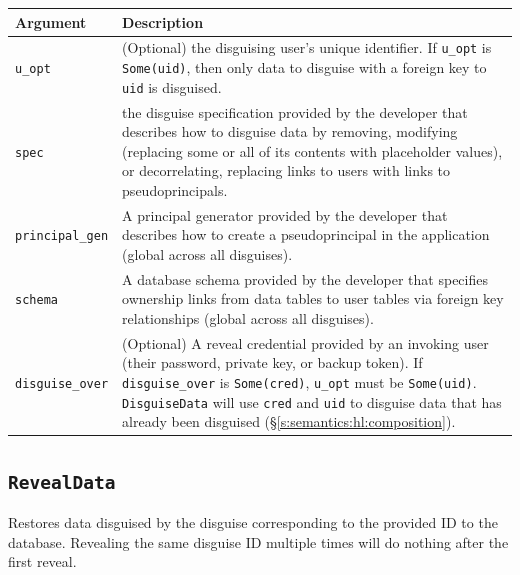     \begin{center}
    \begin{longtable}{|m{}|m{}|}
        \hline
        \textbf{Argument} & \textbf{Description} \\
        \hline
        \texttt{u\_opt}& (Optional) the disguising user's unique identifier. If
            \texttt{u\_opt} is \texttt{Some(uid)}, then only data to disguise with
            a foreign key to \texttt{uid} is disguised.\\

        \hline
        \texttt{spec}& the disguise specification provided by the
            developer that describes how to disguise data by
    removing, modifying (replacing some or all of its contents with placeholder
    values), or decorrelating, replacing links to users with links to
    pseudoprincipals.\\

        \hline
        \texttt{principal\_gen}& A principal generator provided by the developer
    that describes how to create a pseudoprincipal in the application (global
            across all disguises).\\
        \hline
        \texttt{schema}& A database schema provided by the developer that specifies
    ownership links from data tables to user tables via foreign key
    relationships (global across all disguises).\\

        \hline
        \texttt{disguise\_over}& (Optional) A reveal credential provided by an
        invoking user (their password, private key, or backup token).
    If \texttt{disguise\_over} is \texttt{Some(cred)}, \texttt{u\_opt} must be
    \texttt{Some(uid)}. \texttt{DisguiseData} will use \texttt{cred} and
    \texttt{uid} to disguise data that has already been disguised
    (\S\ref{s:semantics:hl:composition}).\\
        \hline
    \end{longtable}
    \end{center}

    \subsection{\texttt{RevealData}}

    Restores data disguised by the disguise corresponding to the provided ID to
    the database. Revealing the same disguise ID multiple times will do nothing
    after the first reveal. 

